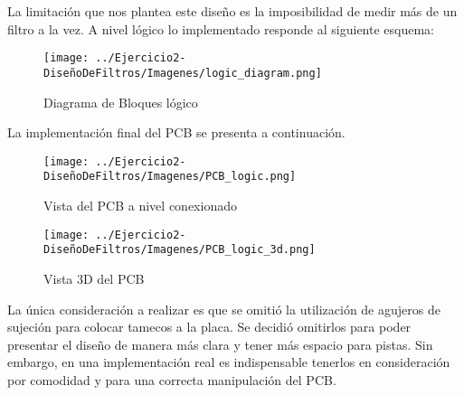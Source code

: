 La limitación que nos plantea este diseño es la imposibilidad de medir más de un filtro a la vez. A nivel lógico lo implementado responde al siguiente 
esquema:

\begin{figure}[H]
    \centering
    \texttt{[image: ../Ejercicio2-DiseñoDeFiltros/Imagenes/logic\_diagram.png]}
    \caption{Diagrama de Bloques lógico}
\end{figure}

La implementación final del PCB se presenta a continuación.
\begin{figure}[H]
    \centering
    \texttt{[image: ../Ejercicio2-DiseñoDeFiltros/Imagenes/PCB\_logic.png]}
    \caption{Vista del PCB a nivel conexionado}
\end{figure}

\begin{figure}[H]
    \centering
    \texttt{[image: ../Ejercicio2-DiseñoDeFiltros/Imagenes/PCB\_logic\_3d.png]}
    \caption{Vista 3D del PCB}
\end{figure}


La única consideración a realizar es que se omitió la utilización de agujeros de sujeción para colocar tamecos a la placa. Se decidió omitirlos 
para poder presentar el diseño de manera más clara y tener más espacio para pistas. Sin embargo, en una implementación real es indispensable tenerlos 
en consideración por comodidad y para una correcta manipulación del PCB.



